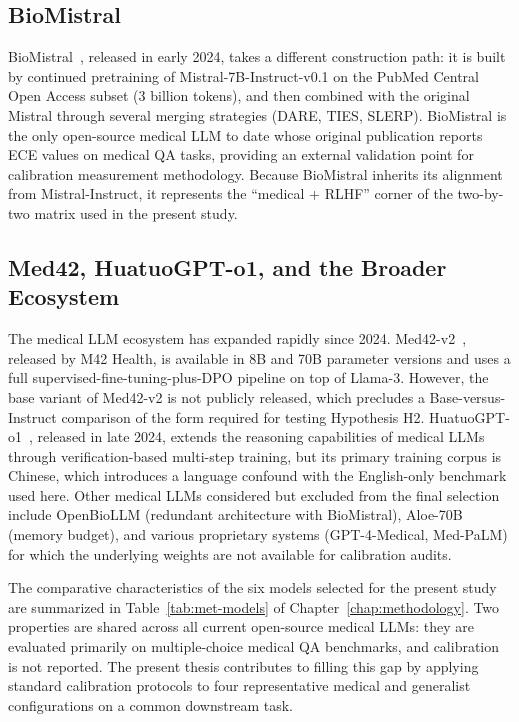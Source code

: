 \subsection{BioMistral}
\label{subsec:sota-biomistral}

BioMistral~\cite{labrak2024biomistral}, released in early 2024, takes 
a different construction path: it is built by continued pretraining 
of Mistral-7B-Instruct-v0.1 on the PubMed Central Open Access subset 
(3 billion tokens), and then combined with the original Mistral through 
several merging strategies (DARE, TIES, SLERP). BioMistral is the only 
open-source medical LLM to date whose original publication reports ECE 
values on medical QA tasks, providing an external validation point for 
calibration measurement methodology. Because BioMistral inherits its 
alignment from Mistral-Instruct, it represents the ``medical + RLHF'' 
corner of the two-by-two matrix used in the present study.

\subsection{Med42, HuatuoGPT-o1, and the Broader Ecosystem}
\label{subsec:sota-others}

The medical LLM ecosystem has expanded rapidly since 2024. 
Med42-v2~\cite{christophe2024med42}, released by M42 Health, is 
available in 8B and 70B parameter versions and uses a full 
supervised-fine-tuning-plus-DPO pipeline on top of Llama-3. However, 
the base variant of Med42-v2 is not publicly released, which precludes 
a Base-versus-Instruct comparison of the form required for testing 
Hypothesis H2. HuatuoGPT-o1~\cite{chen2024huatuogpt}, released in late 
2024, extends the reasoning capabilities of medical LLMs through 
verification-based multi-step training, but its primary training 
corpus is Chinese, which introduces a language confound with the 
English-only benchmark used here. Other medical LLMs considered but 
excluded from the final selection include OpenBioLLM (redundant 
architecture with BioMistral), Aloe-70B (memory budget), and various 
proprietary systems (GPT-4-Medical, Med-PaLM) for which the underlying 
weights are not available for calibration audits.

The comparative characteristics of the six models selected for the 
present study are summarized in Table~\ref{tab:met-models} of 
Chapter~\ref{chap:methodology}. Two properties are shared across all 
current open-source medical LLMs: they are evaluated primarily on 
multiple-choice medical QA benchmarks, and calibration is not reported. 
The present thesis contributes to filling this gap by applying 
standard calibration protocols to four representative medical and 
generalist configurations on a common downstream task.


